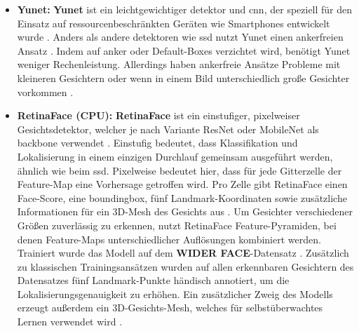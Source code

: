 \begin{itemize}
%	
	\item \textbf{Yunet:} \textbf{Yunet} ist ein leichtgewichtiger \gls{detektor} und \gls{cnn}, der speziell für den Einsatz auf ressourcenbeschränkten Geräten wie Smartphones entwickelt wurde \parencite{wu2023yunet}. Anders als andere \gls{detektor}en wie \gls{ssd} nutzt Yunet einen ankerfreien Ansatz \parencite{wu2023yunet}. Indem auf \gls{anker} oder Default-Boxes verzichtet wird, benötigt Yunet weniger Rechenleistung. Allerdings haben ankerfreie Ansätze Probleme mit kleineren Gesichtern oder wenn in einem Bild unterschiedlich große Gesichter vorkommen \parencite{Wang2018}.
%	
	\item \textbf{RetinaFace (CPU):} \textbf{RetinaFace} ist ein einstufiger, pixelweiser Gesichts\gls{detektor}, welcher je nach Variante ResNet oder MobileNet als \gls{backbone} verwendet \parencite{abs-1905-00641}. Einstufig bedeutet, dass Klassifikation und Lokalisierung in einem einzigen Durchlauf gemeinsam ausgeführt werden, ähnlich wie beim \gls{ssd}. Pixelweise bedeutet hier, dass für jede Gitterzelle der Feature-Map eine Vorhersage getroffen wird. Pro Zelle gibt RetinaFace einen Face-Score, eine \gls{boundingbox}, fünf Landmark-Koordinaten sowie zusätzliche Informationen für ein 3D-Mesh des Gesichts aus \parencite{abs-1905-00641}. Um Gesichter verschiedener Größen zuverlässig zu erkennen, nutzt RetinaFace Feature-Pyramiden, bei denen Feature-Maps unterschiedlicher Auflösungen kombiniert werden. Trainiert wurde das Modell auf dem \textbf{WIDER FACE}-Datensatz \parencite{abs-1905-00641}. Zusätzlich zu klassischen Trainingsansätzen wurden auf allen erkennbaren Gesichtern des Datensatzes fünf Landmark-Punkte händisch annotiert, um die Lokalisierungsgenauigkeit zu erhöhen. Ein zusätzlicher Zweig des Modells erzeugt außerdem ein 3D-Gesichts-Mesh, welches für selbstüberwachtes Lernen verwendet wird \parencite{abs-1905-00641}.
\end{itemize}
